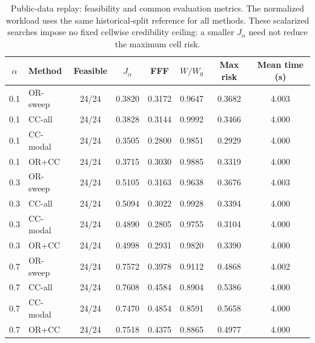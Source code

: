 \begin{table}[t]
\centering
\caption{Public-data replay: feasibility and common evaluation metrics. The normalized workload uses the same historical-split reference for all methods. These scalarized searches impose no fixed cellwise credibility ceiling: a smaller $J_\alpha$ need not reduce the maximum cell risk.}
\label{tab:external-v4-detail}
\footnotesize
\begin{tabular}{clcccccc}
\toprule
$\alpha$ & Method & Feasible & $J_\alpha$ & FFF & $W/W_0$ & Max risk & Mean time (s) \\
\midrule
0.1 & OR-sweep & 24/24 & 0.3820 & 0.3172 & 0.9647 & 0.3682 & 4.003 \\
0.1 & CC-all & 24/24 & 0.3828 & 0.3144 & 0.9992 & 0.3466 & 4.000 \\
0.1 & CC-modal & 24/24 & 0.3505 & 0.2800 & 0.9851 & 0.2929 & 4.000 \\
0.1 & OR+CC & 24/24 & 0.3715 & 0.3030 & 0.9885 & 0.3319 & 4.000 \\
0.3 & OR-sweep & 24/24 & 0.5105 & 0.3163 & 0.9638 & 0.3676 & 4.003 \\
0.3 & CC-all & 24/24 & 0.5094 & 0.3022 & 0.9928 & 0.3394 & 4.000 \\
0.3 & CC-modal & 24/24 & 0.4890 & 0.2805 & 0.9755 & 0.3104 & 4.000 \\
0.3 & OR+CC & 24/24 & 0.4998 & 0.2931 & 0.9820 & 0.3390 & 4.000 \\
0.7 & OR-sweep & 24/24 & 0.7572 & 0.3978 & 0.9112 & 0.4868 & 4.002 \\
0.7 & CC-all & 24/24 & 0.7608 & 0.4584 & 0.8904 & 0.5386 & 4.000 \\
0.7 & CC-modal & 24/24 & 0.7470 & 0.4854 & 0.8591 & 0.5658 & 4.000 \\
0.7 & OR+CC & 24/24 & 0.7518 & 0.4375 & 0.8865 & 0.4977 & 4.000 \\
\bottomrule
\end{tabular}
\end{table}

